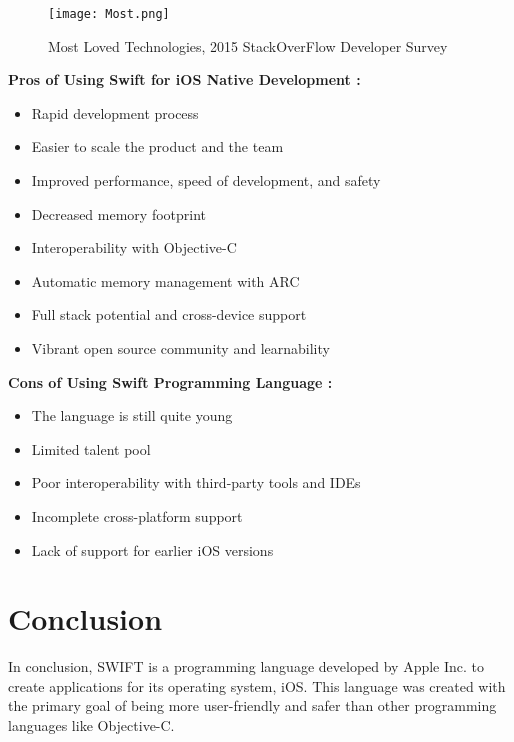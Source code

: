 \documentclass[11pt]{Abdullahmad} %
\begin{document}
\begin{figure}[h]%
        \centering
        \texttt{[image: Most.png]}
	\caption{Most Loved Technologies, 2015 StackOverFlow Developer Survey \cite{moutidis2021community}}
\end{figure}

\textbf {Pros of Using Swift for iOS Native Development :} \cite{10.1145/3196398.3196428}
\begin{itemize}
	\item Rapid development process
	\item Easier to scale the product and the team
	\item Improved performance, speed of development, and safety
	\item Decreased memory footprint
	\item Interoperability with Objective-C
	\item Automatic memory management with ARC
	\item Full stack potential and cross-device support
	\item Vibrant open source community and learnability
\end{itemize}

\textbf {Cons of Using Swift Programming Language :} \cite{nayebi2017swift}
\begin{itemize}
	\item  The language is still quite young
	\item  Limited talent pool
	\item Poor interoperability with third-party tools and IDEs
	\item  Incomplete cross-platform support
	\item  Lack of support for earlier iOS versions
\end{itemize}


 \section*{Conclusion}

In conclusion, SWIFT is a programming language developed by Apple Inc. to create applications for its operating system, iOS. This language was created with the primary goal of being more user-friendly and safer than other programming languages like Objective-C.
\end{document}
